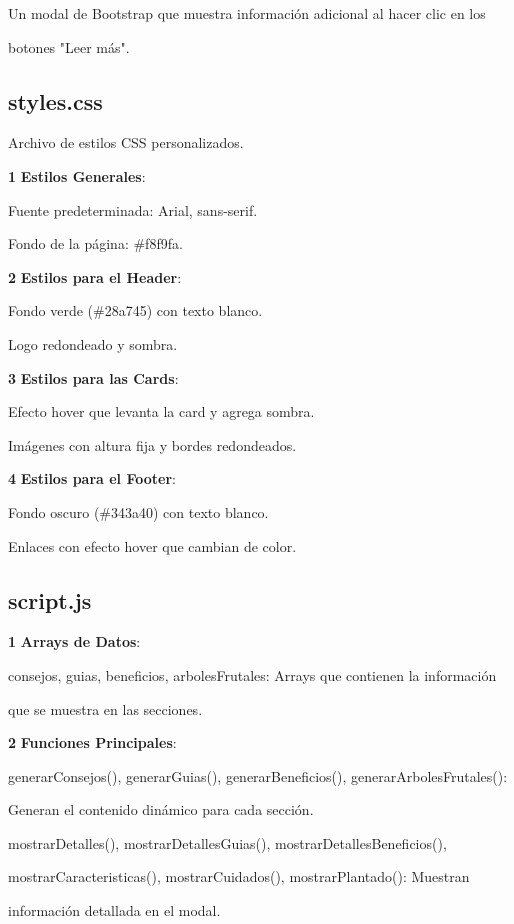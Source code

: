 \documentclass[11pt, a4paper, oneside]{book}
\begin{document}
Un modal de Bootstrap que muestra información adicional al hacer clic en los 

botones "Leer más".


\subsection{ styles.css}
Archivo de estilos CSS personalizados.

\textbf{1 }  \textbf{\textbf{Estilos Generales}}:

 Fuente predeterminada: Arial, sans-serif.

 Fondo de la página: \#f8f9fa.

\textbf{2}  \textbf{\textbf{Estilos para el Header}}:

 Fondo verde (\#28a745) con texto blanco.

Logo redondeado y sombra.

\textbf{3}  \textbf{\textbf{Estilos para las Cards}}:

 Efecto hover que levanta la card y agrega sombra.

Imágenes con altura fija y bordes redondeados.

\textbf{4}\textbf{  \textbf{Estilos para el Footer}}:

 Fondo oscuro (\#343a40) con texto blanco.

Enlaces con efecto hover que cambian de color.


\subsection{script.js}

\textbf{1}  \textbf{\textbf{Arrays de Datos}}:

consejos, guias, beneficios, arbolesFrutales: Arrays que contienen la información 

que se muestra en las secciones.

\textbf{2 }  \textbf{\textbf{Funciones Principales}}:

generarConsejos(), generarGuias(), generarBeneficios(), generarArbolesFrutales(): 

Generan el contenido dinámico para cada sección.

mostrarDetalles(), mostrarDetallesGuias(), mostrarDetallesBeneficios(), 

mostrarCaracteristicas(), mostrarCuidados(), mostrarPlantado(): Muestran 

información detallada en el modal.
\end{document}

